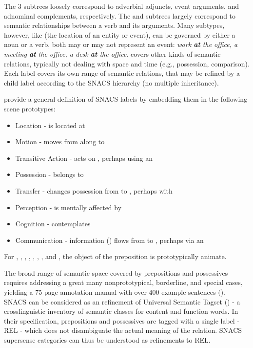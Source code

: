 The 3 subtrees loosely correspond to adverbial adjuncts, event arguments, and adnominal complements, respectively. The  and  subtrees largely correspond to semantic relationships between a verb and its arguments. Many  subtypes, however, like   (the location of an entity or event), can be governed by either a noun or a verb, both may or may not represent an event: \emph{work \textbf{at} the office, a meeting \textbf{at} the office, a desk \textbf{at} the office}.  covers other kinds of semantic relations, typically not dealing with space and time (e.g., possession, comparison). Each label covers its own range of semantic relations, that may be refined by a child label according to the SNACS hierarchy (no multiple inheritance). 

\cite{snacs} provide a general definition of SNACS labels by embedding them in the following scene prototypes: 

\begin{itemize}
\item Location -  is located at 
\item Motion -  moves from  along  to  
\item Transitive Action -  acts on  , perhaps using an  
\item Possession -  belongs to  
\item Transfer -  changes possession from  to , perhaps with 
\item Perception -  is mentally affected by 
\item Cognition -  contemplates 
\item Communication - information () flows from  to , perhaps via an 
\end{itemize}

For , , , , , , , and , the object of the preposition is prototypically animate.

The broad range of semantic space covered by prepositions and possessives requires addressing a great many nonprototypical, borderline, and special cases, yielding a 75-page annotation manual with over 400 example sentences (\cite{schneider-18-arxiv}). SNACS can be considered as an refinement of Universal Semantic Tagset (\cite{abzianidze-17}) - a crosslinguistic inventory of semantic classes for content and function words. In their specification, prepositions and possessives are tagged with a single label - REL - which does not disambiguate the actual meaning of the relation. SNACS supersense categories can thus be understood as refinements to REL.

